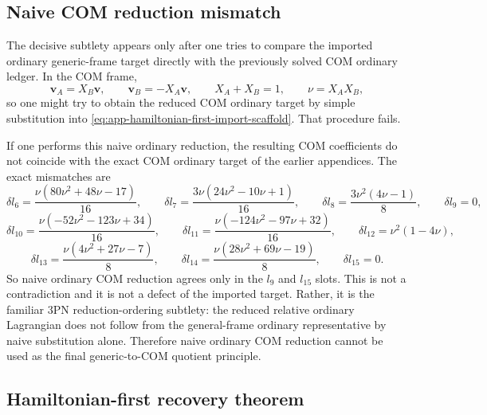 \documentclass[11pt]{article}
\begin{document}
\subsection{Naive COM reduction mismatch}
\label{app:hamiltonian-first-mismatch}

The decisive subtlety appears only after one tries to compare the imported
ordinary generic-frame target directly with the previously solved COM ordinary
ledger.  In the COM frame,
\begin{equation}
\mathbf v_A=X_B\mathbf v,
\qquad
\mathbf v_B=-X_A\mathbf v,
\qquad
X_A+X_B=1,
\qquad
\nu=X_AX_B,
\label{eq:app-hamiltonian-first-com-relations}
\end{equation}
so one might try to obtain the reduced COM ordinary target by simple
substitution into \eqref{eq:app-hamiltonian-first-import-scaffold}.  That
procedure fails.

If one performs this naive ordinary reduction, the resulting COM coefficients do
not coincide with the exact COM ordinary target of the earlier appendices.  The
exact mismatches are
\begin{equation}
\delta l_6=\frac{\nu(80\nu^2+48\nu-17)}{16},
\qquad
\delta l_7=\frac{3\nu(24\nu^2-10\nu+1)}{16},
\qquad
\delta l_8=\frac{3\nu^2(4\nu-1)}{8},
\qquad
\delta l_9=0,
\label{eq:app-hamiltonian-first-dl6-9}
\end{equation}
\begin{equation}
\delta l_{10}=\frac{\nu(-52\nu^2-123\nu+34)}{16},
\qquad
\delta l_{11}=\frac{\nu(-124\nu^2-97\nu+32)}{16},
\qquad
\delta l_{12}=\nu^2(1-4\nu),
\label{eq:app-hamiltonian-first-dl10-12}
\end{equation}
\begin{equation}
\delta l_{13}=\frac{\nu(4\nu^2+27\nu-7)}{8},
\qquad
\delta l_{14}=\frac{\nu(28\nu^2+69\nu-19)}{8},
\qquad
\delta l_{15}=0.
\label{eq:app-hamiltonian-first-dl13-15}
\end{equation}
So naive ordinary COM reduction agrees only in the $l_9$ and $l_{15}$ slots.
This is not a contradiction and it is not a defect of the imported target.
Rather, it is the familiar $3$PN reduction-ordering subtlety: the reduced
relative ordinary Lagrangian does not follow from the general-frame ordinary
representative by naive substitution alone.  Therefore naive ordinary COM
reduction cannot be used as the final generic-to-COM quotient principle.

\subsection{Hamiltonian-first recovery theorem}
\label{app:hamiltonian-first-recovery}
\end{document}
